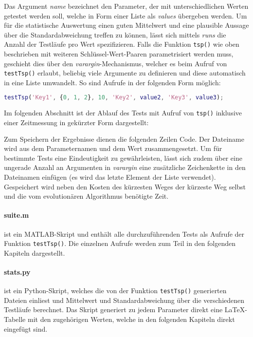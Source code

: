 

\noindent Das Argument \emph{name} bezeichnet den Parameter, der mit
unterschiedlichen Werten getestet werden soll, welche in Form einer Liste als
\emph{values} übergeben werden.
Um für die statistische Auswertung einen guten Mittelwert und eine plausible
Aussage über die Standardabweichung treffen zu können, lässt sich mittels
\emph{runs} die Anzahl der Testläufe pro Wert spezifizieren.
Falls die Funktion {\tt tsp()} wie oben beschrieben mit weiteren Schlüssel-Wert-Paaren
parametrisiert werden muss, geschieht dies über den \emph{varargin}-Mechanismus,
welcher es beim Aufruf von {\tt testTsp()} erlaubt, beliebig viele Argumente zu
definieren und diese automatisch in eine Liste umwandelt. So sind Aufrufe in der
folgenden Form möglich:

\begin{lstlisting}[language=MATLAB]
testTsp('Key1', {0, 1, 2}, 10, 'Key2', value2, 'Key3', value3);
\end{lstlisting}

\noindent Im folgenden Abschnitt ist der Ablauf des Tests mit Aufruf von
{\tt tsp()} inklusive einer Zeitmessung in gekürzter Form dargestellt:



\noindent Zum Speichern der Ergebnisse dienen die folgenden Zeilen Code.
Der Dateiname wird aus dem Parameternamen und dem Wert zusammengesetzt. Um für
bestimmte Tests eine Eindeutigkeit zu gewährleisten, lässt sich zudem über eine ungerade
Anzahl an Argumenten in \emph{varargin} eine zusätzliche Zeichenkette in den
Dateinamen einfügen (es wird das letzte Element der Liste verwendet).
Gespeichert wird neben den Kosten des kürzesten Weges der kürzeste Weg selbst
und die vom evolutionären Algorithmus benötigte Zeit.




\paragraph{suite.m} ist ein MATLAB-Skript und enthält alle durchzuführenden Tests
als Aufrufe der Funktion {\tt testTsp()}. Die einzelnen Aufrufe werden zum Teil
in den folgenden Kapiteln dargestellt.


\paragraph{stats.py} ist ein Python-Skript, welches die von der Funktion
{\tt testTsp()} generierten Dateien einliest und Mittelwert und Standardabweichung
über die verschiedenen Testläufe berechnet.
Das Skript generiert zu jedem Parameter direkt eine \LaTeX-Tabelle mit den
zugehörigen Werten, welche in den folgenden Kapiteln direkt eingefügt sind.

